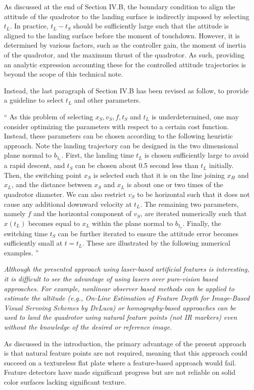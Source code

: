 \documentclass[11pt]{article}
\newenvironment{correction}{\begin{list}{}{\setlength{\leftmargin}{1cm}\setlength{\rightmargin}{1cm}}\vspace{\parsep}\item[]``}{''\end{list}}
\begin{document}
\begin{itemize}
As discussed at the end of Section IV.B, the boundary condition to align the attitude of the quadrotor to the landing surface is indirectly imposed by selecting $t_L$. In practice, $t_L-t_S$ should be sufficiently large such that the attitude is aligned to the landing surface before the moment of touchdown. However, it is determined by various factors, such as the controller gain, the moment of inertia of the quadrotor, and the maximum thrust of the quadrotor. As such, providing an analytic expression accounting these for the controlled attitude trajectories is beyond the scope of this technical note.

Instead, the last paragraph of Section IV.B has been revised as follow, to provide a guideline to select $t_L$ and other parameters.

\begin{correction}
As this problem of selecting $x_S,v_S,f,t_S$ and $t_L$ is underdetermined, one may consider optimizing the parameters with respect to a certain cost function. 
Instead, these parameters can be chosen according to the following heuristic approach.
Note the landing trajectory can be designed in the two dimensional plane normal to $b_{1_c}$. 
First, the landing time $t_L$ is chosen sufficiently large to avoid a rapid descent, and $t_S$ can be chosen about 0.5 second less than $t_L$ initially. 
Then, the switching point $x_S$ is selected such that it is on the line joining $x_H$ and $x_L$, and the distance between $x_S$ and $x_L$ is about one or two times of the quadrotor diameter. 
We can also restrict $v_S$ to be horizontal such that it does not cause any additional downward velocity at $t_L$. 
The remaining two parameters, namely $f$ and the horizontal component of $v_S$, are iterated numerically such that $x(t_L)$ becomes equal to $x_L$ within the plane normal to $b_{1_c}$. 
Finally, the switching time $t_S$ can be further iterated to ensure the attitude error becomes sufficiently small at $t=t_L$. 
These are illustrated by the following numerical examples. 
\end{correction}

\item
\textit{Although the presented approach using laser-based artificial features is interesting, it is difficult to see the advantage of using lasers over pure-vision based approaches. 
For example, nonlinear observer based methods can be applied to estimate the altitude (e.g., On-Line Estimation of Feature Depth
for Image-Based Visual Servoing Schemes by DeLuca) or homography-based approaches can be used to land the quadrotor using natural feature points (not IR markers) even without the knowledge of the desired or reference image.
}

As discussed in the introduction, the primary advantage of the present approach is that natural feature points are not required, meaning that this approach could succeed on a textureless flat plate where a feature-based approach would fail. 
Feature detectors have made significant progress but are not reliable on solid color surfaces lacking significant texture.

\end{itemize}
\end{document}
